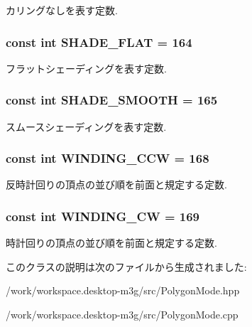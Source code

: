 カリングなしを表す定数. \hypertarget{classm3g_1_1PolygonMode_5da32249eba3f6eb4366f016c424099e}{
\subsubsection[{SHADE\_\-FLAT}]{\setlength{\rightskip}{0pt plus 5cm}const int {\bf SHADE\_\-FLAT} = 164}}
\label{classm3g_1_1PolygonMode_5da32249eba3f6eb4366f016c424099e}


フラットシェーディングを表す定数. \hypertarget{classm3g_1_1PolygonMode_2da5e6696c8e910d9fca74b583a081df}{
\subsubsection[{SHADE\_\-SMOOTH}]{\setlength{\rightskip}{0pt plus 5cm}const int {\bf SHADE\_\-SMOOTH} = 165}}
\label{classm3g_1_1PolygonMode_2da5e6696c8e910d9fca74b583a081df}


スムースシェーディングを表す定数. \hypertarget{classm3g_1_1PolygonMode_98d881cf813edf483860268535014210}{
\subsubsection[{WINDING\_\-CCW}]{\setlength{\rightskip}{0pt plus 5cm}const int {\bf WINDING\_\-CCW} = 168}}
\label{classm3g_1_1PolygonMode_98d881cf813edf483860268535014210}


反時計回りの頂点の並び順を前面と規定する定数. \hypertarget{classm3g_1_1PolygonMode_86975b3dec0d6cc20f54fd82eb13ef9e}{
\subsubsection[{WINDING\_\-CW}]{\setlength{\rightskip}{0pt plus 5cm}const int {\bf WINDING\_\-CW} = 169}}
\label{classm3g_1_1PolygonMode_86975b3dec0d6cc20f54fd82eb13ef9e}


時計回りの頂点の並び順を前面と規定する定数. 

このクラスの説明は次のファイルから生成されました:\begin{CompactItemize}
\item 
/work/workspace.desktop-m3g/src/PolygonMode.hpp\item 
/work/workspace.desktop-m3g/src/PolygonMode.cpp\end{CompactItemize}
